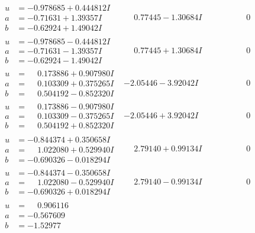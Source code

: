 \documentclass[1p]{elsarticle_modified}
\theoremstyle{definition}
\begin{document}
$$\begin{array}{c|c|c}
\begin{aligned}
u &= -0.978685 + 0.444812 I \\
a &= -0.71631 + 1.39357 I \\
b &= -0.62924 + 1.49042 I\end{aligned}
 & \phantom{-}0.77445 - 1.30684 I & \phantom{-0.000000 } 0 \\ \hline\begin{aligned}
u &= -0.978685 - 0.444812 I \\
a &= -0.71631 - 1.39357 I \\
b &= -0.62924 - 1.49042 I\end{aligned}
 & \phantom{-}0.77445 + 1.30684 I & \phantom{-0.000000 } 0 \\ \hline\begin{aligned}
u &= \phantom{-}0.173886 + 0.907980 I \\
a &= \phantom{-}0.103309 + 0.375265 I \\
b &= \phantom{-}0.504192 - 0.852320 I\end{aligned}
 & -2.05446 - 3.92042 I & \phantom{-0.000000 } 0 \\ \hline\begin{aligned}
u &= \phantom{-}0.173886 - 0.907980 I \\
a &= \phantom{-}0.103309 - 0.375265 I \\
b &= \phantom{-}0.504192 + 0.852320 I\end{aligned}
 & -2.05446 + 3.92042 I & \phantom{-0.000000 } 0 \\ \hline\begin{aligned}
u &= -0.844374 + 0.350658 I \\
a &= \phantom{-}1.022080 + 0.529940 I \\
b &= -0.690326 - 0.018294 I\end{aligned}
 & \phantom{-}2.79140 + 0.99134 I & \phantom{-0.000000 } 0 \\ \hline\begin{aligned}
u &= -0.844374 - 0.350658 I \\
a &= \phantom{-}1.022080 - 0.529940 I \\
b &= -0.690326 + 0.018294 I\end{aligned}
 & \phantom{-}2.79140 - 0.99134 I & \phantom{-0.000000 } 0 \\ \hline\begin{aligned}
u &= \phantom{-}0.906116\phantom{ +0.000000I} \\
a &= -0.567609\phantom{ +0.000000I} \\
b &= -1.52977\phantom{ +0.000000I}\end{aligned}

\end{array}$$
\end{document}
